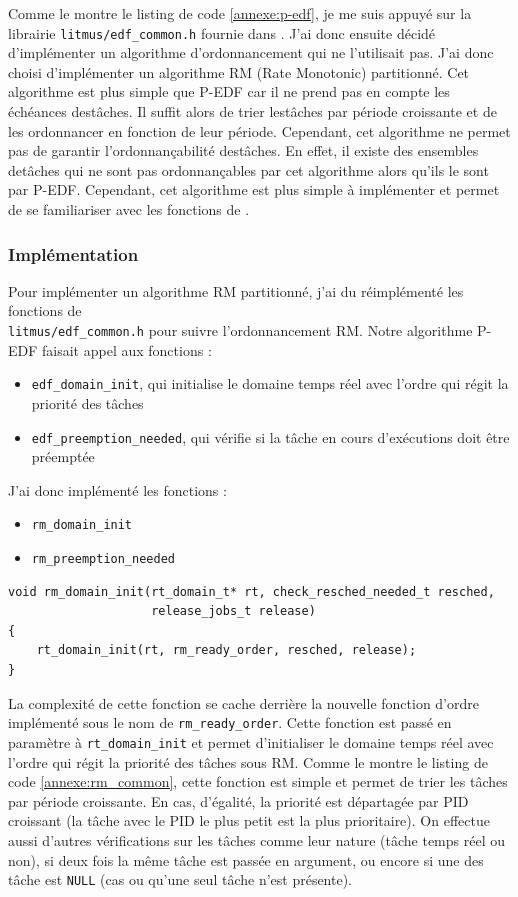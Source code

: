 Comme le montre le listing de code \ref{annexe:p-edf}, je me suis appuyé sur la librairie \texttt{litmus/edf\_common.h} fournie dans \litmus. J'ai donc ensuite décidé d'implémenter un algorithme d'ordonnancement qui ne l'utilisait pas. J'ai donc choisi d'implémenter un algorithme RM (Rate Monotonic) partitionné. Cet algorithme est plus simple que P-EDF car il ne prend pas en compte les échéances destâches. Il suffit alors de trier lestâches par période croissante et de les ordonnancer en fonction de leur période. Cependant, cet algorithme ne permet pas de garantir l'ordonnançabilité destâches. En effet, il existe des ensembles detâches qui ne sont pas ordonnançables par cet algorithme alors qu'ils le sont par P-EDF. Cependant, cet algorithme est plus simple à implémenter et permet de se familiariser avec les fonctions de \litmus.


\subsubsection{Implémentation}

Pour implémenter un algorithme RM partitionné, j'ai du réimplémenté les fonctions de \\ \texttt{litmus/edf\_common.h} pour suivre l'ordonnancement RM. Notre algorithme P-EDF faisait appel aux fonctions :
\begin{itemize}
    \item \texttt{edf\_domain\_init}, qui initialise le domaine temps réel avec l'ordre qui régit la priorité des tâches
    \item \texttt{edf\_preemption\_needed}, qui vérifie si la tâche en cours d'exécutions doit être préemptée
\end{itemize}
J'ai donc implémenté les fonctions :
\begin{itemize}
    \item \texttt{rm\_domain\_init}
    \item \texttt{rm\_preemption\_needed}
\end{itemize}

\begin{lstlisting}[style=cstyle, caption={Fonction \texttt{rm\_domain\_init}}, label={annexe:rm_domain_init}]
void rm_domain_init(rt_domain_t* rt, check_resched_needed_t resched,
					release_jobs_t release)
{
	rt_domain_init(rt, rm_ready_order, resched, release);
}
\end{lstlisting}

La complexité de cette fonction se cache derrière la nouvelle fonction d'ordre implémenté sous le nom de \texttt{rm\_ready\_order}. Cette fonction est passé en paramètre à \texttt{rt\_domain\_init} et permet d'initialiser le domaine temps réel avec l'ordre qui régit la priorité des tâches sous RM. Comme le montre le listing de code \ref{annexe:rm_common}, cette fonction est simple et permet de trier les tâches par période croissante. En cas, d'égalité, la priorité est départagée par PID croissant (la tâche avec le PID le plus petit est la plus prioritaire). On effectue aussi d'autres vérifications sur les tâches comme leur nature (tâche temps réel ou non), si deux fois la même tâche est passée en argument, ou encore si une des tâche est \texttt{NULL} (cas ou qu'une seul tâche n'est présente).

